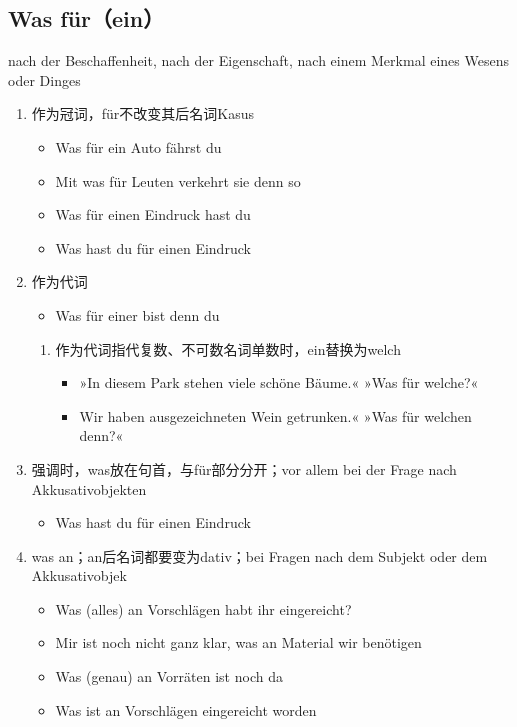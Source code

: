 \documentclass[UTF8]{report}
\begin{document}
\subsection{Was für（ein）}
nach der Beschaffenheit, nach der Eigenschaft, nach einem Merkmal eines Wesens oder Dinges
\begin{enumerate}
    \item 作为冠词，für不改变其后名词Kasus
    \begin{itemize}
        \item Was für ein Auto fährst du
        \item Mit was für Leuten verkehrt sie denn so
        \item Was für einen Eindruck hast du
        \item Was hast du für einen Eindruck
    \end{itemize}
    \item 作为代词
    \begin{itemize}
        \item Was für einer bist denn du
    \end{itemize}
    \begin{enumerate}
        \item 作为代词指代复数、不可数名词单数时，ein替换为welch
        \begin{itemize}
            \item »In diesem Park stehen viele schöne Bäume.« »Was für welche?«
            \item Wir haben ausgezeichneten Wein getrunken.« »Was für welchen denn?«
        \end{itemize}
    \end{enumerate}
    \item 强调时，was放在句首，与für部分分开；vor allem bei der Frage nach Akkusativobjekten
    \begin{itemize}
        \item Was hast du für einen Eindruck
    \end{itemize}
    \item was an；an后名词都要变为dativ；bei Fragen nach dem Subjekt oder dem Akkusativobjek
    \begin{itemize}
        \item Was (alles) an Vorschlägen habt ihr eingereicht?
        \item Mir ist noch nicht ganz klar, was an Material wir benötigen
        \item Was (genau) an Vorräten ist noch da
        \item Was ist an Vorschlägen eingereicht worden

\end{itemize}
\end{enumerate}
\end{document}
